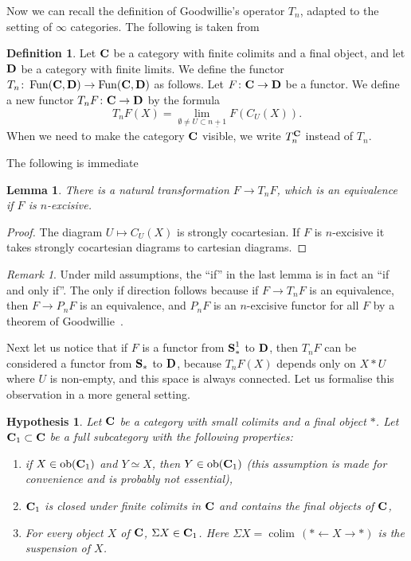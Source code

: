\documentclass[psamsfonts]{amsart}
\theoremstyle{plain}
\newtheorem{lem}[thm]{Lemma}
\newtheorem{hyp}[thm]{Hypothesis}
\theoremstyle{definition}
\newtheorem{defn}[thm]{Definition}
\theoremstyle{remark}
\newtheorem{rem}[thm]{Remark}
\newcommand{\catname}[1]{{\normalfont\textbf{#1}}}
\newcommand{\spaces}{\catname{S}_*}
\newcommand{\connected}{\spaces^{1}}
\newcommand{\ob}{\operatorname{ob}}
\DeclareMathOperator{\fun}{Fun}
\DeclareMathOperator{\colim}{colim \,}
\begin{document}
Now we can recall the definition of Goodwillie's operator $T_n$, adapted to the setting of $\infty$ categories. The following is taken from~\cite[Construction 6.1.1.22]{LurieHA}
\begin{defn}
Let $\catname{C}$ be a category with finite colimits and a final object, and let $\catname{D}$ be a category with finite limits. We define the functor $T_n\colon \fun(\catname{C}, \catname{D})\to \fun(\catname{C}, \catname{D})$ as follows. Let $F\colon \catname{C}\to \catname{D}$ be a functor. We define a new functor $T_nF\colon \catname{C}\to \catname{D}$ by the formula
\[
T_nF(X)=\lim_{\emptyset \ne U\subset \underline{n+1}} F(C_U(X)).
\]
When we need to make the category $\catname{C}$ visible, we write $T_n^{\catname{C}}$ instead of $T_n$.
\end{defn}
The following is immediate
\begin{lem}
There is a natural transformation $F\to T_nF$, which is an equivalence if $F$ is $n$-excisive.
\end{lem}
\begin{proof}
The diagram $U \mapsto C_U(X)$ is strongly cocartesian. If $F$ is $n$-excisive it takes strongly cocartesian diagrams to cartesian diagrams.
\end{proof}
\begin{rem}
Under mild assumptions, the ``if'' in the last lemma is in fact an ``if and only if''. The only if direction follows because if $F\to T_nF$ is an equivalence, then $F\to P_nF$ is an equivalence, and $P_nF$ is an $n$-excisive functor for all $F$ by a theorem of Goodwillie~\cite[Lemma 6.1.1.33]{LurieHA}.
\end{rem}
Next let us notice that if $F$ is a functor from $\connected$ to $\catname{D}$, then $T_nF$ can be considered a functor from $\spaces$ to $\catname{D}$, because $T_nF(X)$ depends only on $X*U$ where $U$ is non-empty, and this space is always connected. Let us formalise this observation in a more general setting. 
\begin{hyp}\label{hypothesis:suspension}
Let $\catname{C}$ be a category with small colimits and a final object $*$. Let $\catname{C}_1\subset \catname{C}$ be a full subcategory with the following properties: 
\begin{enumerate}
\item if $X\in\ob(\catname{C}_1)$ and $Y\simeq X$, then $Y\in \ob(\catname{C}_1)$ (this assumption is made for convenience and is probably not essential),
\item $\catname{C}_1$ is closed under finite colimits in $\catname{C}$ and contains the final objects of $\catname{C}$, 
\item For every object $X$ of $\catname{C}$, $\Sigma X\in \catname{C}_1$. Here $\Sigma X=\colim(* \leftarrow X \rightarrow *)$ is the suspension of $X$.
\end{enumerate}
\end{hyp}
\end{document}
